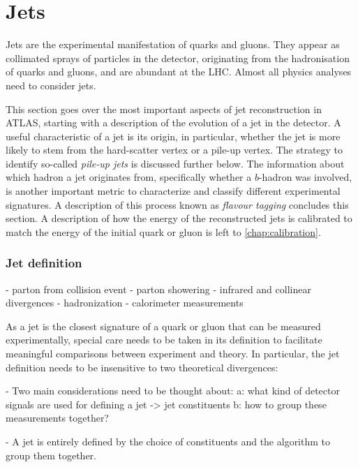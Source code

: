 \section{Jets}
Jets are the experimental manifestation of quarks and gluons.
They appear as collimated sprays of particles in the detector, originating from the hadronisation of quarks and gluons, and are abundant at the LHC. Almost all physics analyses need to consider jets.

This section goes over the most important aspects of jet reconstruction in ATLAS, starting with a description of the evolution of a jet in the detector. 
A useful characteristic of a jet is its origin, in particular, whether the jet is more likely to stem from the hard-scatter vertex or a pile-up vertex. The strategy to identify so-called \emph{pile-up jets} is discussed further below.
The information about which hadron a jet originates from, specifically whether a $b$-hadron was involved, is another important metric to characterize and classify different experimental signatures. A description of this process known as \emph{flavour tagging} concludes this section.
A description of how the energy of the reconstructed jets is calibrated to match the energy of the initial quark or gluon is left to \cref{chap:calibration}. 

\subsubsection{Jet definition}
- parton from collision event
- parton showering
    - infrared and collinear divergences
- hadronization
- calorimeter measurements

As a jet is the closest signature of a quark or gluon that can be measured experimentally, special care needs to be taken in its definition to facilitate meaningful comparisons between experiment and theory.
In particular, the jet definition needs to be insensitive to two theoretical divergences:

- Two main considerations need to be thought about:
    a: what kind of detector signals are used for defining a jet -> jet constituents
    b: how to group these measurements together? 

- A jet is entirely defined by the choice of constituents and the algorithm to group them together.


